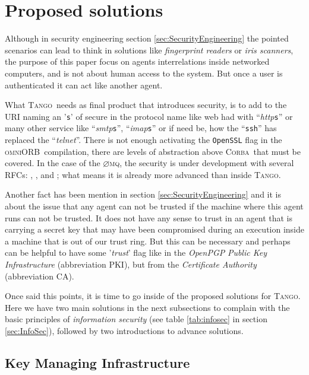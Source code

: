 \documentclass[10pt,a4paper,twoside]{llncs}
\newcommand{\tango}{\textsc{Tango}}
\newcommand{\corba}{\textsc{Corba}}
\newcommand{\omniorb}{\textsc{omniORB}}
\newcommand{\zmq}{\textsc{$\varnothing$mq}}
\begin{document}
\section{Proposed solutions}\label{sec:solutions}

Although in security engineering section \ref{sec:SecurityEngineering} the pointed scenarios can lead to think in solutions like \emph{fingerprint readers} or \emph{iris scanners}, the purpose of this paper focus on agents interrelations inside networked computers, and is not about human access to the system. But once a user is authenticated it can act like another agent.

What \tango\, needs as final product that introduces security, is to add to the URI naming an '{\tt s}' of secure in the protocol name like web had with ``\emph{http}{\tt s}'' or many other service like ``\emph{smtp}{\tt s}'', ``\emph{imap}{\tt s}'' or if need be, how the ``{\tt ssh}'' has replaced the ``\emph{telnet}''. There is not enough activating the {\tt OpenSSL} flag in the \omniorb\, compilation, there are levels of abstraction above \corba\, that must be covered. In the case of the \zmq, the security is under development with several RFCs: \cite{rfc24zmq}, \cite{rfc25zmq}, \cite{rfc27zmq} and \cite{rfc34zmq}; what means it is already more advanced than inside \tango.

Another fact has been mention in section \ref{sec:SecurityEngineering} and it is about the issue that any agent can not be trusted if the machine where this agent runs can not be trusted. It does not have any sense to trust in an agent that is carrying a secret key that may have been compromised during an execution inside a machine that is out of our trust ring. But this can be necessary and perhaps can be helpful to have some '\emph{trust}' flag like in the \emph{OpenPGP} \emph{Public Key Infrastructure} (abbreviation PKI), but from the \emph{Certificate Authority} (abbreviation CA).

Once said this points, it is time to go inside of the proposed solutions for \tango. Here we have two main solutions in the next subsections to complain with the basic principles of \emph{information security} (see table \ref{tab:infosec} in section \ref{sec:InfoSec}), followed by two introductions to advance solutions.

\subsection{Key Managing Infrastructure}
\end{document}
